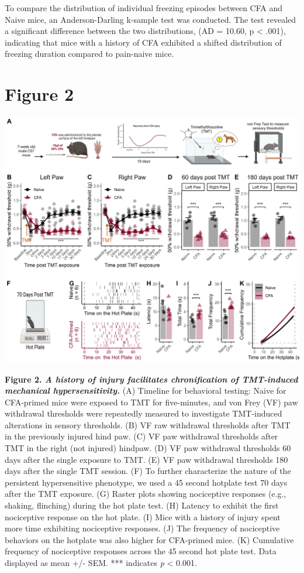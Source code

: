 \documentclass[
]{book}
\begin{document}
To compare the distribution of individual freezing episodes between CFA and Naive mice, an Anderson-Darling k-sample test was conducted. The test revealed a significant difference between the two distributions, (AD = 10.60, p \textless{} .001), indicating that mice with a history of CFA exhibited a shifted distribution of freezing duration compared to pain-naive mice.

\chapter*{Figure 2}\label{figure-2}

\includegraphics[width=75in]{Figs/2_TMT_VF}

\textbf{Figure 2. \emph{A history of injury facilitates chronification of TMT-induced mechanical hypersensitivity.}} (A) Timeline for behavioral testing: Naive for CFA-primed mice were exposed to TMT for five-minutes, and von Frey (VF) paw withdrawal thresholds were repeatedly measured to investigate TMT-induced alterations in sensory thresholds. (B) VF raw withdrawal thresholds after TMT in the previously injured hind paw. (C) VF paw withdrawal thresholds after TMT in the right (not injured) hindpaw. (D) VF paw withdrawal thresholds 60 days after the single exposure to TMT. (E) VF paw withdrawal thresholds 180 days after the single TMT session. (F) To further characterize the nature of the persistent hypersensitive phenotype, we used a 45 second hotplate test 70 days after the TMT exposure. (G) Raster plots showing nociceptive responses (e.g., shaking, flinching) during the hot plate test. (H) Latency to exhibit the first nociceptive response on the hot plate. (I) Mice with a history of injury spent more time exhibiting nociceptive responses. (J) The frequency of nociceptive behaviors on the hotplate was also higher for CFA-primed mice. (K) Cumulative frequency of nociceptive responses across the 45 second hot plate test. Data displayed as mean +/- SEM. *** indicates \emph{p} \textless{} 0.001.
\end{document}
